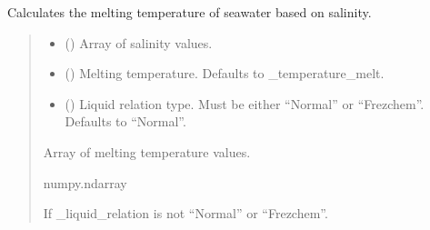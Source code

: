 \documentclass[a4paper,11pt,english,openany]{sphinxmanual}
\begin{document}
\begin{fulllineitems}
\label{\detokenize{api/spyice.update_physical_values:spyice.update_physical_values.calculate_melting_temperature_from_salinity}}
\pysigstartsignatures
{}
\pysigstopsignatures
\sphinxAtStartPar
Calculates the melting temperature of seawater based on salinity.
\begin{quote}\begin{description}
\begin{itemize}
\item {} 
\sphinxAtStartPar
{} () \textendash{} Array of salinity values.

\item {} 
\sphinxAtStartPar
{} (\sphinxstyleliteralemphasis{\sphinxupquote{, }}) \textendash{} Melting temperature. Defaults to \_temperature\_melt.

\item {} 
\sphinxAtStartPar
{} (\sphinxstyleliteralemphasis{\sphinxupquote{, }}) \textendash{} Liquid relation type. Must be either “Normal” or “Frezchem”. Defaults to “Normal”.

\end{itemize}

\sphinxAtStartPar
Array of melting temperature values.

\sphinxAtStartPar
numpy.ndarray

\sphinxAtStartPar
{} \textendash{} If \_liquid\_relation is not “Normal” or “Frezchem”.

\end{description}\end{quote}

\end{fulllineitems}
\end{document}
